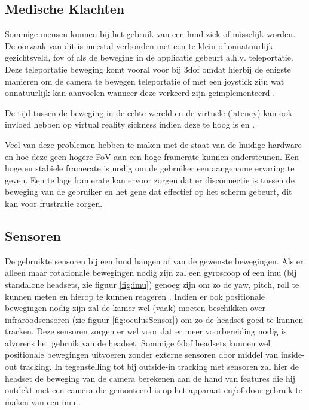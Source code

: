 \subsection{Medische Klachten}\label{sec:medical}
Sommige mensen kunnen bij het gebruik van een \acrshort{hmd} ziek of misselijk worden. De oorzaak van dit is meestal verbonden met een te klein of onnatuurlijk gezichtsveld, \acrfull{fov} \autocite{Lin2002} of als de beweging in de applicatie gebeurt a.h.v. teleportatie. Deze teleportatie beweging komt vooral voor bij \acrshort{3dof} omdat hierbij de enigste manieren om de camera te bewegen teleportatie of met een joystick zijn wat onnatuurlijk kan aanvoelen wanneer deze verkeerd zijn geimplementeerd \autocite{Frommel2017}.

De tijd tussen de beweging in de echte wereld en de virtuele (latency) kan ook invloed hebben op virtual reality sickness indien deze te hoog is \autocite{Elbamby2018} en \autocite{DiZio2000}. 

Veel van deze problemen hebben te maken met de staat van de huidige hardware en hoe deze geen hogere FoV aan een hoge framerate kunnen ondersteunen. Een hoge en stabiele framerate is nodig om de gebruiker een aangename ervaring te geven. Een te lage framerate kan ervoor zorgen dat er disconnectie is tussen de beweging van de gebruiker en het gene dat effectief op het scherm gebeurt, dit kan voor frustratie zorgen.

\subsection{Sensoren}
De gebruikte sensoren bij een \acrshort{hmd} hangen af van de gewenste bewegingen. Als er alleen maar rotationale bewegingen nodig zijn zal een gyroscoop of een \acrfull{imu} (bij standalone headsets, zie figuur \ref{fig:imu}) genoeg zijn om zo de yaw, pitch, roll te kunnen meten en hierop te kunnen reageren \autocite{LaValle2014}. Indien er ook positionale bewegingen nodig zijn zal de kamer wel (vaak) moeten beschikken over infraroodsensoren (zie figuur \ref{fig:oculusSensor}) om zo de headset goed te kunnen tracken. Deze sensoren zorgen er wel voor dat er meer voorbereiding nodig is alvorens het gebruik van de headset. Sommige \acrfull{6dof} headsets kunnen wel positionale bewegingen uitvoeren zonder externe sensoren door middel van inside-out tracking. In tegenstelling tot bij outside-in tracking met sensoren zal hier de headset de beweging van de camera berekenen aan de hand van features die hij ontdekt met een camera die gemonteerd is op het apparaat en/of door gebruik te maken van een \acrshort{imu} \autocite{Ribo2001}.

